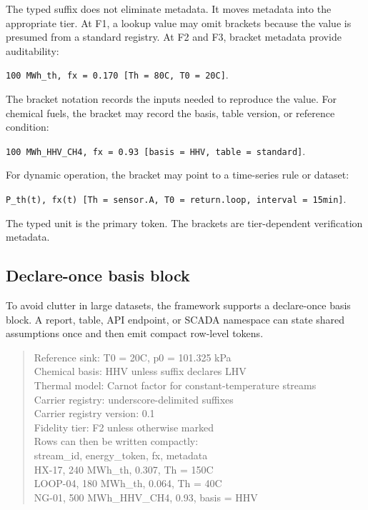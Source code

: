 \documentclass[11pt]{article}
\begin{document}
The typed suffix does not eliminate metadata. It moves metadata into the appropriate tier. At F1, a lookup value may omit brackets because the value is presumed from a standard registry. At F2 and F3, bracket metadata provide auditability:
\begin{center}
\texttt{100 MWh\_th, fx = 0.170 [Th = 80C, T0 = 20C]}.
\end{center}
The bracket notation records the inputs needed to reproduce the value. For chemical fuels, the bracket may record the basis, table version, or reference condition:
\begin{center}
\texttt{100 MWh\_HHV\_CH4, fx = 0.93 [basis = HHV, table = standard]}.
\end{center}
For dynamic operation, the bracket may point to a time-series rule or dataset:
\begin{center}
\texttt{P\_th(t), fx(t) [Th = sensor.A, T0 = return.loop, interval = 15min]}.
\end{center}
The typed unit is the primary token. The brackets are tier-dependent verification metadata.

\subsection{Declare-once basis block}

To avoid clutter in large datasets, the framework supports a declare-once basis block. A report, table, API endpoint, or SCADA namespace can state shared assumptions once and then emit compact row-level tokens.

\begin{quote}\small\ttfamily
Reference sink: T0 = 20C, p0 = 101.325 kPa\\
Chemical basis: HHV unless suffix declares LHV\\
Thermal model: Carnot factor for constant-temperature streams\\
Carrier registry: underscore-delimited suffixes\\
Carrier registry version: 0.1\\
Fidelity tier: F2 unless otherwise marked\\[0.4em]
Rows can then be written compactly:\\
stream\_id, energy\_token, fx, metadata\\
HX-17, 240 MWh\_th, 0.307, Th = 150C\\
LOOP-04, 180 MWh\_th, 0.064, Th = 40C\\
NG-01, 500 MWh\_HHV\_CH4, 0.93, basis = HHV
\end{quote}
\end{document}
